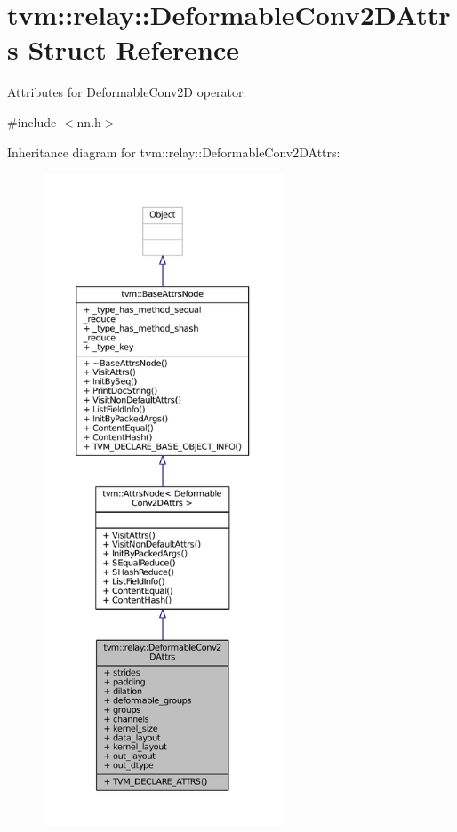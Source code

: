\hypertarget{structtvm_1_1relay_1_1DeformableConv2DAttrs}{}\section{tvm\+:\+:relay\+:\+:Deformable\+Conv2\+D\+Attrs Struct Reference}
\label{structtvm_1_1relay_1_1DeformableConv2DAttrs}


Attributes for Deformable\+Conv2D operator.  




{\ttfamily \#include $<$nn.\+h$>$}



Inheritance diagram for tvm\+:\+:relay\+:\+:Deformable\+Conv2\+D\+Attrs\+:
\nopagebreak
\begin{figure}[H]
\begin{center}
\leavevmode
\includegraphics[height=550pt]{structtvm_1_1relay_1_1DeformableConv2DAttrs__inherit__graph}
\end{center}
\end{figure}


